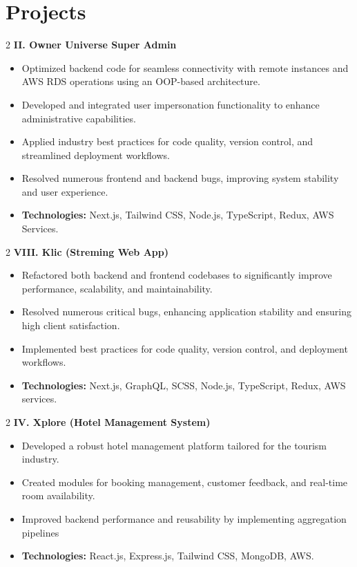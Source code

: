 \documentclass[10pt, letterpaper]{article}
\newenvironment{highlights}{
    \begin{itemize}[
        topsep=0.10 cm,
        parsep=0.10 cm,
        partopsep=0pt,
        itemsep=0pt,
        leftmargin=0.4 cm + 10pt
    ]
}{
    \end{itemize}
}
\newenvironment{twocolentry}[2][]{
    \onecolentry
    \def\secondColumn{#2}
    \setcolumnwidth{\fill, 4.5 cm}
    \begin{paracol}{2}
}{
    \switchcolumn \raggedleft \secondColumn
    \end{paracol}
    \endonecolentry
}
\let\hrefWithoutArrow\href
\renewcommand{\href}[2]{\hrefWithoutArrow{#1}{\ifthenelse{\equal{#2}{}}{ }{#2 }\raisebox{.15ex}{\footnotesize \faExternalLink*}}}
\begin{document}
\section{Projects}
\vspace{1em}
\begin{twocolentry}{
		\href{https://osfrontend.ownersjungle.com/owner-inventory/dashboard}{Live}
	}{
		\textbf{II. Owner Universe Super Admin}
	}
\begin{highlights}
    \item Optimized backend code for seamless connectivity with remote instances and AWS RDS operations using an OOP-based architecture.
    \item Developed and integrated user impersonation functionality to enhance administrative capabilities.
    \item Applied industry best practices for code quality, version control, and streamlined deployment workflows.
    \item Resolved numerous frontend and backend bugs, improving system stability and user experience.
    \item \textbf{Technologies:} Next.js, Tailwind CSS, Node.js, TypeScript, Redux, AWS Services.
\end{highlights}
\end{twocolentry}
\vspace{1em}
\begin{twocolentry}{
		\href{https://dev.klic.gg}{Live}
	}{
		\textbf{VIII. Klic (Streming Web App)}
	}
	\begin{highlights}
    \item Refactored both backend and frontend codebases to significantly improve performance, scalability, and maintainability.
    \item Resolved numerous critical bugs, enhancing application stability and ensuring high client satisfaction.
    \item Implemented best practices for code quality, version control, and deployment workflows.
    \item \textbf{Technologies:} Next.js, GraphQL, SCSS, Node.js, TypeScript, Redux, AWS services.
\end{highlights}
\end{twocolentry}
\vspace{1em}
\begin{twocolentry}{
		\href{https://xplorepk.com/}{Live}
	}{
		\textbf{IV. Xplore (Hotel Management System)}
	}
	\begin{highlights}
		\item Developed a robust hotel management platform tailored for the tourism industry.
		\item Created modules for booking management, customer feedback, and real-time room availability.
		\item Improved backend performance and reusability by implementing aggregation pipelines
		\item \textbf{Technologies:} React.js, Express.js, Tailwind CSS, MongoDB, AWS.
	\end{highlights}
\end{twocolentry}
\end{document}
